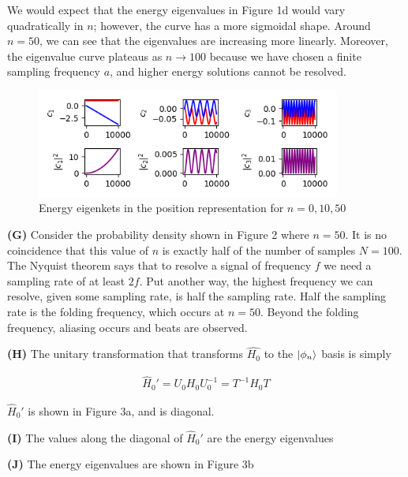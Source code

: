 \documentclass[12pt]{article}
\theoremstyle{definition}
\begin{document}
{We would expect that the energy eigenvalues in Figure 1d would vary quadratically in $n$; however, the curve has a more sigmoidal shape. Around $n=50$, we can see that the eigenvalues are increasing more linearly. Moreover, the eigenvalue curve plateaus as $n\rightarrow 100$ because we have chosen a finite sampling frequency $a$, and higher energy solutions cannot be resolved.

\begin{figure}[t!]
\centering
\includegraphics[width=10cm]{Figure_2}
\caption{Energy eigenkets in the position representation for $n=0,10,50$}
\label{fig:method}
\end{figure}

\vspace{0.1in}
\noindent \textbf{(G)} Consider the probability density shown in Figure 2 where $n=50$. It is no coincidence that this value of $n$ is exactly half of the number of samples $N=100$. The Nyquist theorem says that to resolve a signal of frequency $f$ we need a sampling rate of at least $2f$. Put another way, the highest frequency we can resolve, given some sampling rate, is half the sampling rate. Half the sampling rate is the folding frequency, which occurs at $n=50$. Beyond the folding frequency, aliasing occurs and beats are observed.


\vspace{0.1in}
\noindent \textbf{(H)} The unitary transformation that transforms $\hat{H_{0}}$ to the $\ket{\phi_{n}}$ basis is simply

\begin{align*}
\hat{H}_{0}' = U_{0} H_{0} U_{0}^{-1} = T^{-1} H_{0} T
\end{align*}

$\hat{H}_{0}'$ is shown in Figure 3a, and is diagonal.

\vspace{0.1in}
\noindent \textbf{(I)} The values along the diagonal of $\hat{H}_{0}'$ are the energy eigenvalues

\vspace{0.1in}
\noindent \textbf{(J)} The energy eigenvalues are shown in Figure 3b

}
\end{document}
